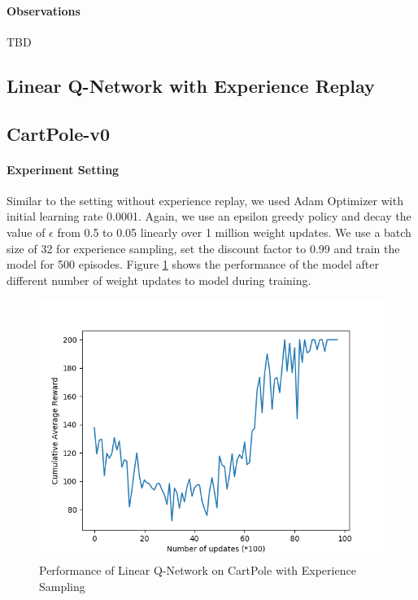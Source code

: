\documentclass[12pt]{article}
\begin{document}
\paragraph{Observations} TBD

\pagebreak[4]

\subsection{Linear Q-Network with Experience Replay}
\subsection*{CartPole-v0}

\paragraph{Experiment Setting} Similar to the setting without experience replay, we used Adam Optimizer with initial learning rate 0.0001. Again, we use an epsilon greedy policy and decay the value of $\epsilon$ from 0.5 to 0.05 linearly over 1 million weight updates. We use a batch size of 32 for experience sampling, set the discount factor to 0.99 and train the model for 500 episodes. Figure \ref{fig:02} shows the performance of the model after different number of weight updates to model during training.
\begin{figure}[h]
  \centering
  \vspace{-5mm}
  \includegraphics[width=0.8\linewidth]{figures/reward_plot_02.png}
  \caption{Performance of Linear Q-Network on CartPole with Experience Sampling}
  \label{fig:02}
\end{figure}
\end{document}
